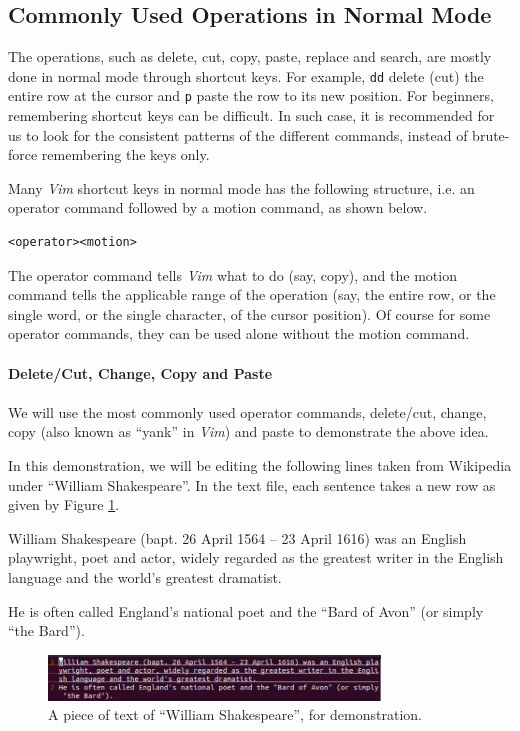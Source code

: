 \subsection{Commonly Used Operations in Normal Mode}

The operations, such as delete, cut, copy, paste, replace and search, are mostly done in normal mode through shortcut keys. For example, \verb|dd| delete (cut) the entire row at the cursor and \verb|p| paste the row to its new position. For beginners, remembering shortcut keys can be difficult. In such case, it is recommended for us to look for the consistent patterns of the different commands, instead of brute-force remembering the keys only.

Many \textit{Vim} shortcut keys in normal mode has the following structure, i.e. an operator command followed by a motion command, as shown below.
\begin{verbatim}
<operator><motion>
\end{verbatim}
The operator command tells \textit{Vim} what to do (say, copy), and the motion command tells the applicable range of the operation (say, the entire row, or the single word, or the single character, of the cursor position). Of course for some operator commands, they can be used alone without the motion command.
\\
\\
\noindent \textbf{Delete/Cut, Change, Copy and Paste}
\\
\\
We will use the most commonly used operator commands, delete/cut, change, copy (also known as ``yank'' in \textit{Vim}) and paste to demonstrate the above idea.

In this demonstration, we will be editing the following lines taken from Wikipedia under ``William Shakespeare''. In the text file, each sentence takes a new row as given by Figure \ref{ch3fig:vimdemo1}.

\begin{shortbox}
William Shakespeare (bapt. 26 April 1564 – 23 April 1616) was an English playwright, poet and actor, widely regarded as the greatest writer in the English language and the world's greatest dramatist.

He is often called England's national poet and the ``Bard of Avon'' (or simply ``the Bard'').
\end{shortbox}

\begin{figure}
\centering
\includegraphics[width=250pt]{chapters/chapter3/figures/vimdemo1.png}
\caption{A piece of text of ``William Shakespeare'', for demonstration.} \label{ch3fig:vimdemo1}
\end{figure}

